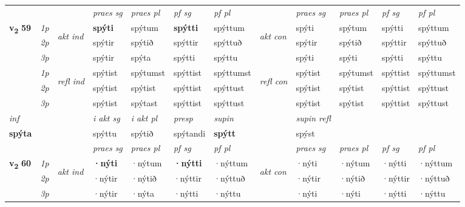 \begin{longtable}[l]{X>{\footnotesize\itshape}llXXXXlXXXX}
 & &   & \textit{praes sg}  & \textit{praes pl}    & \textit{ pf sg} & \textit{pf pl} & & \textit{praes sg}  & \textit{praes pl}    & \textit{pf sg} & \textit{pf pl }  \\ \cmidrule{4-7} \cmidrule{9-12}
 \multirow{2}{*}{{{\textbf{v{\textsubscript{2}}} \Large{\textbf{59}}}}}  & 1p & \multirow{3}{*}{\begin{turn}{90}\textit{akt ind}\end{turn}} & \textbf{spýti} & spýtum & \textbf{spýtti} & spýttum & \multirow{3}{*}{\begin{turn}{90}\textit{akt con}\end{turn}} &spýti & spýtum & spýtti & spýttum\\*
 & 2p &  &  spýtir  & spýtið & spýttir & spýttuð & & spýtir & spýtið & spýttir & spýttuð \\*
 & 3p &  & spýtir & spýta & spýtti & spýttu & & spýti & spýti& spýtti & spýttu \\*
\cmidrule{4-7} \cmidrule{9-12}
 & 1p & \multirow{3}{*}{\begin{turn}{90}\textit{refl ind}\end{turn}}  & spýtist & spýtumst & spýttist & spýttumst & \multirow{3}{*}{\begin{turn}{90}\textit{refl con}\end{turn}}  &spýtist & spýtumst & spýttist & spýttumst \\*
 & 2p &  & spýtist & spýtist & spýttist & spýttust & &spýtist & spýtist & spýttist & spýttust \\*
 & 3p  & & spýtist & spýtast & spýttist & spýttust & & spýtist & spýtist& spýttist & spýttust \\*
\cmidrule{4-7} \cmidrule{9-12}

   {\textit{inf}} & &  & \textit{i akt sg} & \textit{i akt pl}   & \textit{presp} & \textit{supin} && \textit{supin refl}  \\*
  {\textbf{spýta}} & && spýttu  & spýtið   & spýtandi &  \textbf{spýtt} && spýst  \\*

\midrule

 & &   & \textit{praes sg}  & \textit{praes pl}    & \textit{ pf sg} & \textit{pf pl} & & \textit{praes sg}  & \textit{praes pl}    & \textit{pf sg} & \textit{pf pl }  \\ \cmidrule{4-7} \cmidrule{9-12}
 \multirow{2}{*}{{{\textbf{v{\textsubscript{2}}} \Large{\textbf{60}}}}}  & 1p & \multirow{3}{*}{\begin{turn}{90}\textit{akt ind}\end{turn}} & \textbf{·nýti} & ·nýtum & \textbf{·nýtti} & ·nýttum & \multirow{3}{*}{\begin{turn}{90}\textit{akt con}\end{turn}} &·nýti & ·nýtum & ·nýtti & ·nýttum\\*
 & 2p &  &  ·nýtir  & ·nýtið & ·nýttir & ·nýttuð & & ·nýtir & ·nýtið & ·nýttir & ·nýttuð \\*
 & 3p &  & ·nýtir & ·nýta & ·nýtti & ·nýttu & & ·nýti & ·nýti& ·nýtti & ·nýttu \\*
\cmidrule{4-7} \cmidrule{9-12}


\end{longtable}
